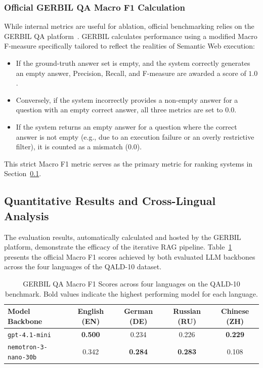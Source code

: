 \subsubsection{Official GERBIL QA Macro F1 Calculation}
While internal metrics are useful for ablation, official benchmarking relies on the GERBIL QA platform~\cite{usbeck2019gerbilqa}. GERBIL calculates performance using a modified Macro F-measure specifically tailored to reflect the realities of Semantic Web execution:
\begin{itemize}
    \item If the ground-truth answer set is empty, and the system correctly generates an empty answer, Precision, Recall, and F-measure are awarded a score of $1.0$.
    \item Conversely, if the system incorrectly provides a non-empty answer for a question with an empty correct answer, all three metrics are set to $0.0$.
    \item If the system returns an empty answer for a question where the correct answer is not empty (e.g., due to an execution failure or an overly restrictive filter), it is counted as a mismatch ($0.0$).
\end{itemize}
This strict Macro F1 metric serves as the primary metric for ranking systems in Section~\ref{sec:quantitative_results}.

\subsection{Quantitative Results and Cross-Lingual Analysis}
\label{sec:quantitative_results}

The evaluation results, automatically calculated and hosted by the GERBIL platform, demonstrate the efficacy of the iterative RAG pipeline. Table~\ref{tab:gerbil_results} presents the official Macro F1 scores achieved by both evaluated LLM backbones across the four languages of the QALD-10 dataset.

\begin{table}[htbp]
\centering
\caption{GERBIL QA Macro F1 Scores across four languages on the QALD-10 benchmark. Bold values indicate the highest performing model for each language.}
\label{tab:gerbil_results}
\begin{tabular}{lcccc}
\hline
\textbf{Model Backbone} & \textbf{English (EN)} & \textbf{German (DE)} & \textbf{Russian (RU)} & \textbf{Chinese (ZH)} \\
\hline
\texttt{gpt-4.1-mini} & \textbf{0.500} & 0.234 & 0.226 & \textbf{0.229} \\
\texttt{nemotron-3-nano-30b} & 0.342 & \textbf{0.284} & \textbf{0.283} & 0.108 \\
\hline
\end{tabular}
\end{table}

